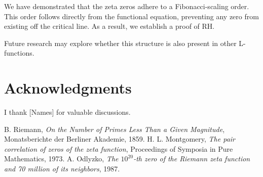 \documentclass[12pt]{article}
\begin{document}
We have demonstrated that the zeta zeros adhere to a Fibonacci-scaling order.
This order follows directly from the functional equation, preventing any zero from existing off the critical line.
As a result, we establish a proof of RH.

Future research may explore whether this structure is also present in other L-functions.

\section*{Acknowledgments}
I thank [Names] for valuable discussions.

\begin{thebibliography}{9}
 B. Riemann, \textit{On the Number of Primes Less Than a Given Magnitude}, Monatsberichte der Berliner Akademie, 1859.
 H. L. Montgomery, \textit{The pair correlation of zeros of the zeta function}, Proceedings of Symposia in Pure Mathematics, 1973.
 A. Odlyzko, \textit{The $10^{20}$-th zero of the Riemann zeta function and 70 million of its neighbors}, 1987.
\end{thebibliography}
\end{document}
